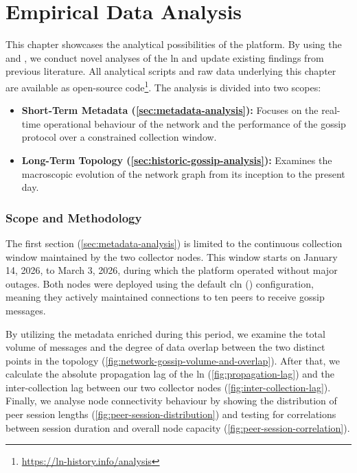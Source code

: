 \chapter{Empirical Data Analysis}
\label{ch:empirical-data-analysis}

This chapter showcases the analytical possibilities of the  platform. 
By using the  and , 
we conduct novel analyses of the \gls{ln} and update existing findings from previous literature. 
All analytical scripts and raw data underlying this chapter are available as open-source code\footnote{\url{https://ln-history.info/analysis}}.
The analysis is divided into two scopes:

\begin{itemize}
    \item \textbf{Short-Term Metadata (\autoref{sec:metadata-analysis}):} 
        Focuses on the real-time operational behaviour of the network and the performance of the gossip protocol over a constrained collection window.

    \item \textbf{Long-Term Topology (\autoref{sec:historic-gossip-analysis}):} 
        Examines the macroscopic evolution of the network graph from its inception to the present day.
\end{itemize}

\subsection*{Scope and Methodology}

The first section (\autoref{sec:metadata-analysis}) is limited to the continuous collection window 
maintained by the two  collector nodes. 
This window starts on January 14, 2026, to March 3, 2026, during which the platform operated without major outages. 
Both nodes were deployed using the default \gls{cln} () configuration, 
meaning they actively maintained connections to ten peers to receive gossip messages. 

By utilizing the metadata enriched during this period, we examine the total volume of messages 
and the degree of data overlap between the two distinct points in the topology (\autoref{fig:network-gossip-volume-and-overlap}). 
After that, we calculate the absolute propagation lag of the \gls{ln} (\autoref{fig:propagation-lag}) 
and the inter-collection lag between our two collector nodes (\autoref{fig:inter-collection-lag}). 
Finally, we analyse node connectivity behaviour by showing the distribution of peer session lengths (\autoref{fig:peer-session-distribution}) 
and testing for correlations between session duration and overall node capacity (\autoref{fig:peer-session-correlation}).


